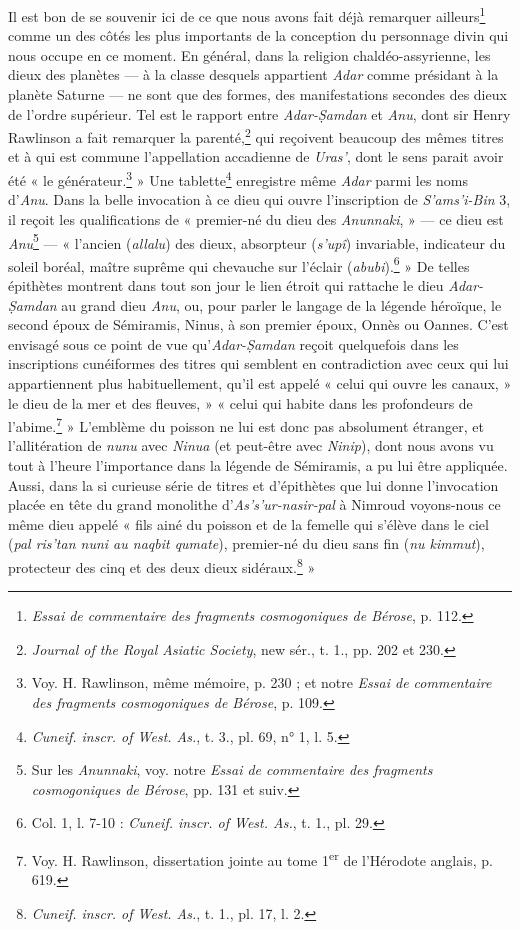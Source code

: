 \documentclass[a4paper, 11pt, oneside, landscape]{article}
\begin{document}
Il est bon de se souvenir ici de ce que nous avons fait déjà remarquer ailleurs\footnote{\emph{Essai de commentaire des fragments cosmogoniques de Bérose}, p. 112.} comme un des côtés les plus importants de la conception du personnage divin qui nous occupe en ce moment. En général, dans la religion chaldéo-assyrienne, les dieux des planètes --- à la classe desquels appartient \emph{Adar} comme présidant à la planète Saturne --- ne sont que des formes, des manifestations secondes des dieux de l'ordre supérieur. Tel est le rapport entre \emph{Adar-\d{S}amdan} et \emph{Anu}, dont sir Henry Rawlinson a fait remarquer la parenté,\footnote{\emph{Journal of the Royal Asiatic Society}, new sér., t. 1., pp. 202 et 230.} qui reçoivent beaucoup des mêmes titres et à qui est commune l'appellation accadienne de \emph{Uras'}, dont le sens parait avoir été « le générateur.\footnote{Voy. H. Rawlinson, même mémoire, p. 230 ; et notre \emph{Essai de commentaire des fragments cosmogoniques de Bérose}, p. 109.} » Une tablette\footnote{\emph{Cuneif. inscr. of West. As.}, t. 3., pl. 69, n° 1, l. 5.} enregistre même \emph{Adar} parmi les noms d'\emph{Anu}. Dans la belle invocation à ce dieu qui ouvre l'inscription de \emph{S'ams'i-Bin} 3, il reçoit les qualifications de « premier-né du dieu des \emph{Anunnaki}, » --- ce dieu est \emph{Anu}\footnote{Sur les \emph{Anunnaki}, voy. notre \emph{Essai de commentaire des fragments cosmogoniques de Bérose}, pp. 131 et suiv.} --- « l'ancien (\emph{allalu}) des dieux, absorpteur (\emph{s'upî}) invariable, indicateur du soleil boréal, maître suprême qui chevauche sur l'éclair (\emph{abubi}).\footnote{Col. 1, l. 7-10 : \emph{Cuneif. inscr. of West. As.}, t. 1., pl. 29.} » De telles épithètes montrent dans tout son jour le lien étroit qui rattache le dieu \emph{Adar-\d{S}amdan} au grand dieu \emph{Anu}, ou, pour parler le langage de la légende héroïque, le second époux de Sémiramis, Ninus, à son premier époux, Onnès ou Oannes. C'est envisagé sous ce point de vue qu'\emph{Adar-\d{S}amdan} reçoit quelquefois dans les inscriptions cunéiformes des titres qui semblent en contradiction avec ceux qui lui appartiennent plus habituellement, qu'il est appelé « celui qui ouvre les canaux, » le dieu de la mer et des fleuves, » « celui qui habite dans les profondeurs de l'abime.\footnote{Voy. H. Rawlinson, dissertation jointe au tome 1\textsuperscript{er} de l'Hérodote anglais, p. 619.} » L'emblème du poisson ne lui est donc pas absolument étranger, et l'allitération de \emph{nunu} avec \emph{Ninua} (et peut-être avec \emph{Ninip}), dont nous avons vu tout à l'heure l'importance dans la légende de Sémiramis, a pu lui être appliquée. Aussi, dans la si curieuse série de titres et d'épithètes que lui donne l'invocation placée en tête du grand monolithe d'\emph{As's'ur-nasir-pal} à Nimroud voyons-nous ce même dieu appelé « fils ainé du poisson et de la femelle qui s'élève dans le ciel (\emph{pal ris'tan nuni au naqbit qumate}), premier-né du dieu sans fin (\emph{nu kimmut}), protecteur des cinq et des deux dieux sidéraux.\footnote{\emph{Cuneif. inscr. of West. As.}, t. 1., pl. 17, l. 2.} »
\end{document}
